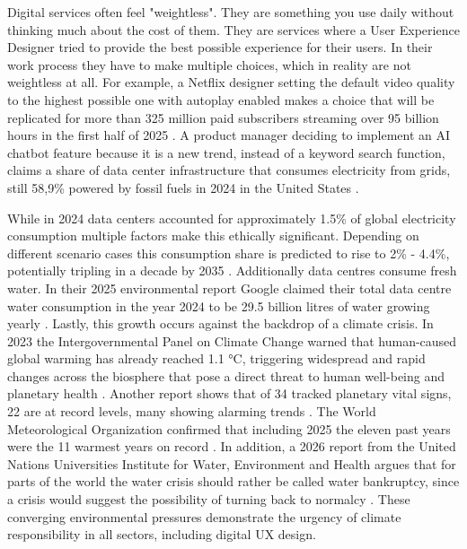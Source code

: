 
Digital services often feel "weightless". They are something you use daily without thinking much about the cost of them. They are services where a User Experience Designer tried to provide the best possible experience for their users. In their work process they have to make multiple choices, which in reality are not weightless at all. For example, a Netflix designer setting the default video quality to the highest possible one with autoplay enabled makes a choice that will be replicated for more than 325 million paid subscribers streaming over 95 billion hours in the first half of 2025 \cite{Netflix2025Q4, Netflix2025H1}. A product manager deciding to implement an AI chatbot feature because it is a new trend, instead of a keyword search function, claims a share of data center infrastructure that consumes electricity from grids, still 58,9\% powered by fossil fuels in 2024 in the United States \cite{IEA2025GlobalReview}.

\par While in 2024 data centers accounted for approximately 1.5\% of global electricity consumption multiple factors make this ethically significant. Depending on different scenario cases this consumption share is predicted to rise to 2\% - 4.4\%, potentially tripling in a decade by 2035 \cite{IEA2025EnergyAI}. Additionally data centres consume fresh water. In their 2025 environmental report Google claimed their total data centre water consumption in the year 2024 to be 29.5 billion litres of water growing yearly \cite{Google2025EnvReport}. Lastly, this growth occurs against the backdrop of a climate crisis. In 2023 the Intergovernmental Panel on Climate Change warned that human-caused global warming has already reached 1.1 °C, triggering widespread and rapid changes across the biosphere that pose a direct threat to human well-being and planetary health \cite{IPCC2023Synthesis}. Another report shows that of 34 tracked planetary vital signs, 22 are at record levels, many showing alarming trends \cite{Ripple2025StateClimate}. The World Meteorological Organization confirmed that including 2025 the eleven past years were the 11 warmest years on record \cite{WMO2026WarmestYear}. In addition, a 2026 report from the United Nations Universities Institute for Water, Environment and Health argues that for parts of the world the water crisis should rather be called water bankruptcy, since a crisis would suggest the possibility of turning back to normalcy \cite{UNU2026WaterBankruptcy}. These converging environmental pressures demonstrate the urgency of climate responsibility in all sectors, including digital UX design.


